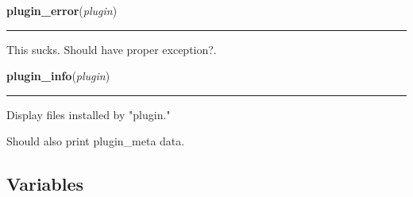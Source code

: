     \label{sakura:plugin_error}

    \vspace{0.5ex}

\hspace{.8\funcindent}\begin{boxedminipage}{\funcwidth}

    \raggedright \textbf{plugin\_error}(\textit{plugin})

    \vspace{-1.5ex}

    \rule{\textwidth}{0.5\fboxrule}
\setlength{\parskip}{2ex}
    This sucks. Should have proper exception?.

\setlength{\parskip}{1ex}
    \end{boxedminipage}

    \label{sakura:plugin_info}

    \vspace{0.5ex}

\hspace{.8\funcindent}\begin{boxedminipage}{\funcwidth}

    \raggedright \textbf{plugin\_info}(\textit{plugin})

    \vspace{-1.5ex}

    \rule{\textwidth}{0.5\fboxrule}
\setlength{\parskip}{2ex}
    Display files installed by "plugin."

    Should also print plugin\_meta data.

\setlength{\parskip}{1ex}
    \end{boxedminipage}



  \subsection{Variables}

